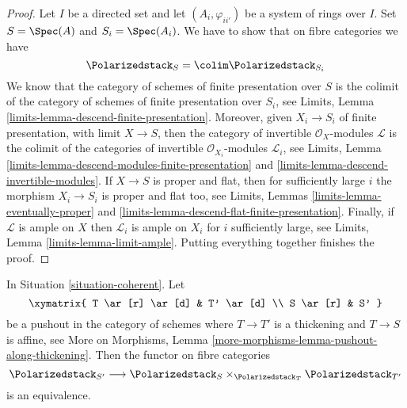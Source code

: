 \begin{proof}
Let $I$ be a directed set and let $(A_i, \varphi_{ii'})$
be a system of rings over $I$. Set $S = \Spec(A)$ and
$S_i = \Spec(A_i)$. We have to show that on fibre categories we have
$$
\Polarizedstack_S = \colim \Polarizedstack_{S_i}
$$
We know that the category of schemes of finite presentation over
$S$ is the colimit of the category of schemes of finite presentation
over $S_i$, see
Limits, Lemma \ref{limits-lemma-descend-finite-presentation}.
Moreover, given $X_i \to S_i$ of finite presentation, with
limit $X \to S$, then the category of invertible
$\mathcal{O}_X$-modules $\mathcal{L}$ is the colimit of the categories
of invertible $\mathcal{O}_{X_i}$-modules $\mathcal{L}_i$, see
Limits, Lemma \ref{limits-lemma-descend-modules-finite-presentation} and
\ref{limits-lemma-descend-invertible-modules}.
If $X \to S$ is proper and flat, then for sufficiently large
$i$ the morphism $X_i \to S_i$ is proper and flat too, see
Limits, Lemmas \ref{limits-lemma-eventually-proper} and
\ref{limits-lemma-descend-flat-finite-presentation}.
Finally, if $\mathcal{L}$ is ample on $X$
then $\mathcal{L}_i$ is ample on $X_i$ for
$i$ sufficiently large, see
Limits, Lemma \ref{limits-lemma-limit-ample}.
Putting everything together finishes the proof.
\end{proof}

\begin{lemma}
\label{lemma-polarized-RS-star}
In Situation \ref{situation-coherent}. Let
$$
\xymatrix{
T \ar[r] \ar[d] & T' \ar[d] \\
S \ar[r] & S'
}
$$
be a pushout in the category of schemes where
$T \to T'$ is a thickening and $T \to S$ is affine, see
More on Morphisms, Lemma \ref{more-morphisms-lemma-pushout-along-thickening}.
Then the functor on fibre categories
$$
\Polarizedstack_{S'}
\longrightarrow
\Polarizedstack_S \times_{\Polarizedstack_T} \Polarizedstack_{T'}
$$
is an equivalence.
\end{lemma}

